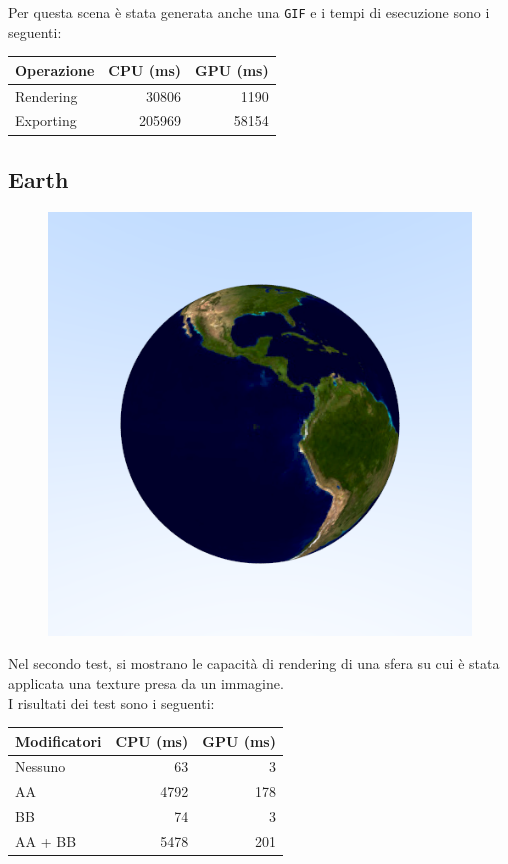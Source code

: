 \documentclass{article}
\begin{document}
Per questa scena è stata generata anche una \texttt{GIF} e i tempi di esecuzione sono i seguenti:

\begin{table}[H]
    \centering
    \begin{tabular}{|l|r|r|}
    \hline
    \textbf{Operazione} & \textbf{CPU (ms)} & \textbf{GPU (ms)} \\ \hline
    Rendering  & 30806  & 1190  \\ \hline
    Exporting  & 205969 & 58154 \\ \hline
    \end{tabular}
\end{table}

\subsection{Earth}

\begin{figure}[H]
    \centering
    \includegraphics[width=0.5\linewidth]{earth.png}
    \label{fig:earth}
\end{figure}

Nel secondo test, si mostrano le capacità di rendering di una sfera su cui è stata applicata una texture presa da un immagine.\\

I risultati dei test sono i seguenti:

\begin{table}[H]
    \centering
    \begin{tabular}{|l|r|r|}
    \hline
    \textbf{Modificatori} & \textbf{CPU (ms)}   & \textbf{GPU (ms)} \\ \hline
    Nessuno      & 63   & 3   \\ \hline
    AA           & 4792 & 178 \\ \hline
    BB           & 74   & 3   \\ \hline
    AA + BB      & 5478 & 201 \\ \hline
    \end{tabular}
\end{table}
\end{document}
